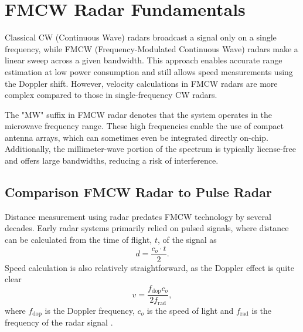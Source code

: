 \def\PageLayout{single-no-print}
\def\DocLanguage{en}
\def\PackagesIncludeTikz{yes}
\def\PackagesIncludeBib{yes}









\usepackage{pdfpages}

\newcommand{\sirad}{SiRad Easy\textsuperscript{\copyright} }
\newcommand{\boldred}[1]{\textbf{\textcolor{red}{#1}}}
\newcommand{\boldblue}[1]{\textbf{\textcolor{blue}{#1}}}






\tableofcontents

\newpage
{}
\setcounter{page}{1}





\pagestyle{fancy}

\chapter{FMCW Radar Fundamentals}

Classical CW (Continuous Wave) radars broadcast a signal only on a single frequency, while FMCW (Frequency-Modulated Continuous Wave) radars make a linear sweep across a given bandwidth.
This approach enables accurate range estimation at low power consumption and still allows speed measurements using the Doppler shift.
However, velocity calculations in FMCW radars are more complex compared to those in single-frequency CW radars.

The "MW" suffix in FMCW radar denotes that the system operates in the microwave frequency range.
These high frequencies enable the use of compact antenna arrays, which can sometimes even be integrated directly on-chip.
Additionally, the millimeter-wave portion of the spectrum is typically license-free \cite{spektrumCTU} and offers large bandwidths, reducing a risk of interference.

\section{Comparison FMCW Radar to Pulse Radar}

Distance measurement using radar predates FMCW technology by several decades.
Early radar systems primarily relied on pulsed signals, where distance can be calculated from the time of flight, $t$, of the signal as
\begin{equation}
  d = \frac{c_o \cdot t}{2}.
  \label{eq:distance}
\end{equation}
Speed calculation is also relatively straightforward, as the Doppler effect is quite clear
\begin{equation}
  v = \frac{f_\mathrm{dop} c_o}{2f_\mathrm{rad}},
  \label{eq:dopler}
\end{equation}
where $f_\mathrm{dop}$ is the Doppler frequency, $c_o$ is the speed of light and $f_\mathrm{rad}$ is the frequency of the radar signal \cite{jankiraman2018}.

